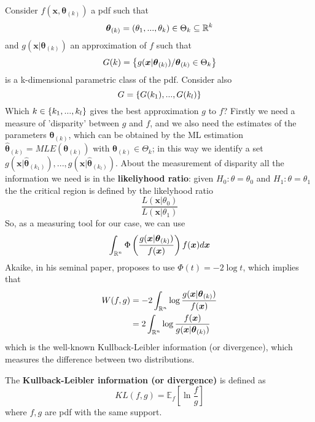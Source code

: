 \begin{proposition}
    Consider $f(\boldsymbol{x}, \boldsymbol{\theta}_{(k)})$ a pdf such that
    \[
        \boldsymbol{\theta}_{(k)}=(\theta_1,...,\theta_k)\in\Theta_k\subseteq\mathbb{R}^k  
    \]
    and $g(\boldsymbol{x}|\boldsymbol{\theta}_{(k)})$ an approximation of $f$ such that
    \[
        G(k)=\left\{g(\boldsymbol{x}|\boldsymbol{\theta}_{(k)})/\boldsymbol{\theta}_{(k)}\in\Theta_k\right\}  
    \]
    is a k-dimensional parametric class of the pdf. Consider also 
    \[
        G=\left\{G(k_1),...,G(k_l)\right\}  
    \]
    Which $k\in\left\{k_1,...,k_l\right\}$ gives the best approximation $g$ to $f$? Firstly we need a measure of 'disparity' between $g$ and $f$, and we also need the estimates of the parameters $\boldsymbol{\theta}_{(k)}$, which can be obtained by the ML estimation $\hat{\boldsymbol{\theta}}_{(k)}=MLE(\boldsymbol{\theta}_{(k)})$ with $\boldsymbol{\theta}_{(k)}\in\Theta_k$; in this way we identify a set $g(\boldsymbol{x}|\hat{\boldsymbol{\theta}}_{(k_1)}),...,g(\boldsymbol{x}|\hat{\boldsymbol{\theta}}_{(k_l)})$. About the measurement of disparity all the information we need is in the \textbf{likeliyhood ratio}: given $H_0:\theta=\theta_0$ and $H_1:\theta=\theta_1$ the the critical region is defined by the likelyhood ratio
    \[
        \frac{L(\boldsymbol{x}|\theta_0)}{L(\boldsymbol{x}|\theta_1)}  
    \]
    So, as a measuring tool for our case, we can use
    \[
        \int_{\mathbb{R}^n}\Phi\left(\frac{g(\boldsymbol{x}|\boldsymbol{\theta}_{(k)})}{f(\boldsymbol{x})}\right)f(\boldsymbol{x})d\boldsymbol{x}
    \]
    Akaike, in his seminal paper, proposes to use $\Phi(t)=-2\log t$, which implies that
    \begin{equation*}
        \begin{split}
            W(f,g)&=-2\int_{\mathbb{R}^n}\log\frac{g(\boldsymbol{x}|\boldsymbol{\theta}_{(k)})}{f(\boldsymbol{x})}\\
            &=2\int_{\mathbb{R}^n}\log\frac{f(\boldsymbol{x})}{g(\boldsymbol{x}|\boldsymbol{\theta}_{(k)})}\\
        \end{split}
    \end{equation*}
    which is the well-known Kullback-Leibler information (or divergence), which measures the difference between two distributions.
\end{proposition}

\begin{definition}
    The \textbf{Kullback-Leibler information (or divergence)} is defined as
    \[
        KL(f,g)=\mathbb{E}_f\left[\ln\frac{f}{g}\right]  
    \]
    where $f,g$ are pdf with the same support.
\end{definition}


